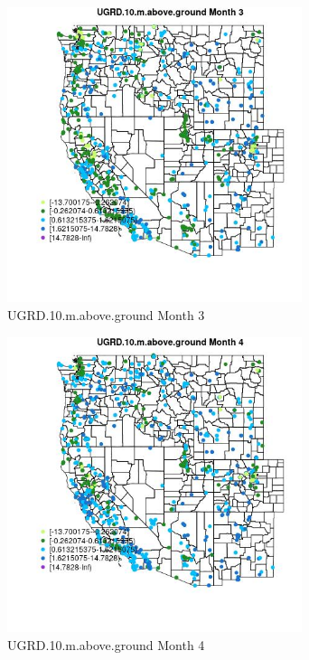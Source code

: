 \begin{figure} 
\centering  
\includegraphics[width=0.77\textwidth]{Code_Outputs/Report_ML_input_PM25_Step4_part_f_de_duplicated_aveswNAs_MapObsMo3UGRD10maboveground.jpg} 
\caption{\label{fig:Report_ML_input_PM25_Step4_part_f_de_duplicated_aveswNAsMapObsMo3UGRD10maboveground}UGRD.10.m.above.ground Month 3} 
\end{figure} 
 

\begin{figure} 
\centering  
\includegraphics[width=0.77\textwidth]{Code_Outputs/Report_ML_input_PM25_Step4_part_f_de_duplicated_aveswNAs_MapObsMo4UGRD10maboveground.jpg} 
\caption{\label{fig:Report_ML_input_PM25_Step4_part_f_de_duplicated_aveswNAsMapObsMo4UGRD10maboveground}UGRD.10.m.above.ground Month 4} 
\end{figure} 
 

